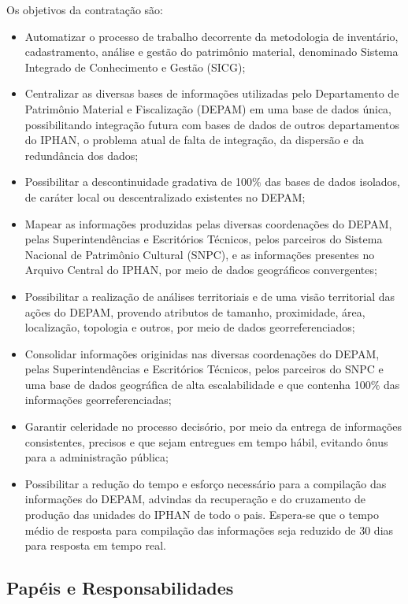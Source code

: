 Os objetivos da contratação são:

\begin{itemize}
\item Automatizar o processo de trabalho decorrente da metodologia de inventário, cadastramento, análise e gestão do patrimônio material, denominado Sistema Integrado de Conhecimento e Gestão (SICG);
\item Centralizar as diversas bases de informações utilizadas pelo Departamento de Patrimônio Material e Fiscalização (DEPAM) em uma base de dados única, possibilitando integração futura com bases de dados de outros departamentos do IPHAN,   o problema atual de falta de integração, da dispersão e da redundância dos dados;
\item Possibilitar a descontinuidade gradativa de 100\% das bases de dados isolados, de caráter local ou descentralizado existentes no DEPAM;
\item Mapear as informações produzidas pelas diversas coordenações do DEPAM, pelas Superintendências e Escritórios Técnicos, pelos parceiros do Sistema Nacional de Patrimônio Cultural (SNPC), e as informações presentes no Arquivo Central do IPHAN, por meio de dados geográficos convergentes;
\item Possibilitar a realização de análises territoriais e de uma visão territorial das ações do DEPAM, provendo atributos de tamanho, proximidade, área, localização, topologia e outros, por meio de dados georreferenciados;
\item Consolidar informações originidas nas diversas coordenações do DEPAM, pelas Superintendências e Escritórios Técnicos, pelos parceiros do SNPC e uma base de dados geográfica de alta escalabilidade e que contenha 100\% das informações georreferenciadas;
\item Garantir celeridade no processo decisório, por meio da entrega de informações consistentes, precisos e que sejam entregues em tempo hábil, evitando ônus para a administração pública;
\item Possibilitar a redução do tempo e esforço necessário para a compilação das informações do DEPAM, advindas da recuperação e do cruzamento de produção das unidades do IPHAN de todo o pais. Espera-se que o tempo médio de resposta para compilação das informações seja reduzido de 30 dias para resposta em tempo real.
\end{itemize}

\subsection[Papéis e Responsabilidades]{Papéis e Responsabilidades}

